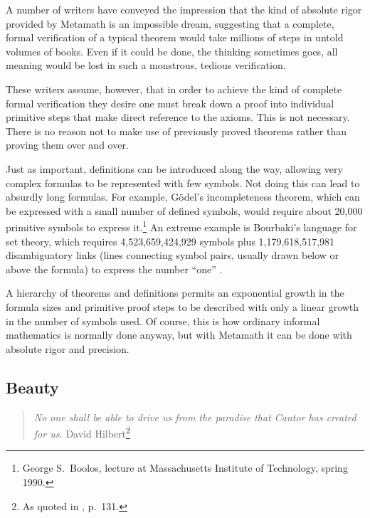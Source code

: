 A number of writers have conveyed the impression that the kind of absolute
rigor provided by Metamath is an impossible dream, suggesting
that a complete, formal verification of a typical theorem
would take millions of steps in untold volumes of books.  Even if it could be
done, the thinking sometimes goes, all meaning would be lost in such a
monstrous, tedious verification.

These writers assume, however, that in order to achieve the kind of complete
formal verification they desire one must break down a proof into individual
primitive steps that make direct reference to the axioms.  This is
not necessary.  There is no reason not to make use of previously proved
theorems rather than proving them over and over.

Just as important, definitions can be introduced along
the way, allowing very complex formulas to be represented with few
symbols.  Not doing this can lead to absurdly long formulas.  For
example, G\"{o}del's incompleteness theorem, which can be expressed with a small number of
defined symbols, would require about 20,000 primitive symbols to express
it.\footnote{George S.\ Boolos, lecture at
Massachusetts Institute of Technology, spring 1990.} An extreme example
is Bourbaki's\label{bourbaki} language for set theory, which requires
4,523,659,424,929 symbols plus 1,179,618,517,981 disambiguatory links
(lines connecting symbol pairs, usually drawn below or above the
formula) to express the number
``one'' \cite{Mathias}.

A hierarchy of theorems and definitions permits an
exponential growth in the formula sizes and primitive proof steps to be
described with only a linear growth in the number of symbols used.  Of course,
this is how ordinary informal mathematics is normally done anyway, but with
Metamath it can be done with absolute rigor and precision.

\subsection{Beauty}


\begin{quote}
  {\em No one shall be able to drive us from the paradise that Cantor has
created for us.}
   \flushright\sc  David Hilbert\footnote{As quoted in \cite{Moore}, p.~131.}\\
\end{quote}


